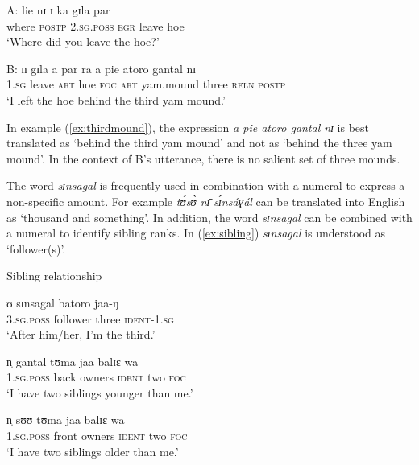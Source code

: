 \begin{exe}
\begin{exe}
\begin{exe}
{\begin{exe}
\begin{exe}
\begin{exe}
\begin{exe}
\begin{exe}
\begin{exe}
\begin{exe}
\begin{xlist}
\begin{exe}
\begin{exe}
\begin{exe}
\ea
\ea\label{ex:thirdmound}
\gll A: lie nɪ ɪ ka gɪla par    \\
    {} {where} \textsc{postp}  \textsc{2.sg.poss}  \textsc{egr} {leave} {hoe}
\\
\glt   `Where did you leave the hoe?'

\gll B: n̩ gɪla a par ra a   pie atoro  gantal  nɪ    \\
    {}  \textsc{1.sg}  {leave} \textsc{art}   {hoe} \textsc{foc} 
\textsc{art} {yam.mound} {three} \textsc{reln}  \textsc{postp} \\
\glt   `I left the hoe behind the third yam mound.'

\z
\z


In example (\ref{ex:thirdmound}),  the expression {\it a pie atoro  gantal nɪ} 
is
best translated as `behind the third yam mound' and not as `behind the three yam
mound'. In the context of B's utterance, there is no  salient set of three
mounds.  




The word  {\it sɪnsagal} is frequently  used in combination with a numeral to
express a non-specific amount. For example  {\it tʊ́sʊ̀ nɪ̄ sɪ́nsáɣál}  can be
translated into English as  `thousand and something'. In addition,  the word 
{\it sɪnsagal} can be combined with a numeral to identify sibling ranks. In 
(\ref{ex:sibling})  {\it sɪnsagal} is understood as `follower(s)'.  


\begin{exe}
\ex\label{ex:sibling}{\rm Sibling relationship}
\begin{xlist}

\ex\label{ex:sibling-a}
\gll ʊ sɪnsagal batoro jaa-ŋ \\
      \textsc{3.sg.poss} {follower} {three} \textsc{ident-1.sg}  \\
 \glt  `After him/her, I'm the third.'

\ex\label{ex:sibling-b}
\gll n̩ gantal tʊma jaa balɪɛ wa \\
    \textsc{1.sg.poss} {back} {owners} \textsc{ident}  {two}  \textsc{foc}   \\
\glt   `I have two siblings younger than me.' 


\ex\label{ex:sibling-c}
\gll n̩ sʊʊ tʊma jaa balɪɛ wa \\
   \textsc{1.sg.poss} {front} {owners} \textsc{ident}  {two}  \textsc{foc}   \\
 \glt  `I have two siblings older than me.'
\end{xlist}
\end{exe}




\end{exe}
\end{exe}
\end{exe}
\end{xlist}
\end{exe}
\end{exe}
\end{exe}
\end{exe}
\end{exe}
\end{exe}
\end{exe}}
\end{exe}
\end{exe}
\end{exe}
